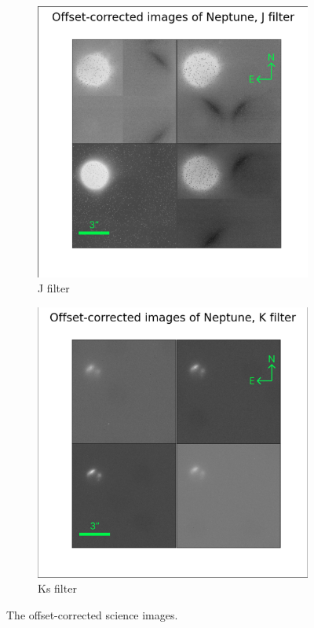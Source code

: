 \documentclass{article}
\begin{document}
\begin{figure}
\begin{subfigure}[b]{0.3\textwidth}
            \includegraphics[width=\textwidth]{corr_J_sc.png}
            \caption[uncorr J]%
            {{\small J filter}}    
            \label{fig:corr_J}
        \end{subfigure}
        \hfill
        \begin{subfigure}[b]{0.3\textwidth}
            \centering
            \includegraphics[width=\textwidth]{corr_K_sc.png}
            \caption[uncorr Ks]%
            {{\small Ks filter}}    
            \label{fig:corr_Ks}
        \end{subfigure}
        \caption{The offset-corrected science images.}
        \label{fig:corr_images}
    \end{figure}
\end{document}

